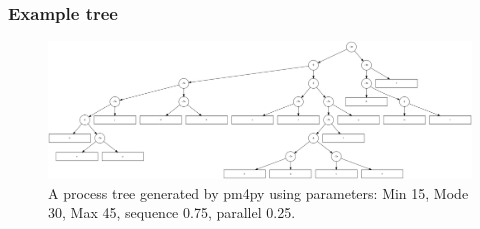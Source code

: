 \documentclass{beamer}
\begin{document}
	\begin{frame}
		\frametitle{Example tree}
		\begin{figure}
			\includegraphics[width=1\textwidth]{figures/process-tree}
			\caption{A process tree generated by pm4py using parameters: Min 15, Mode 30, Max 45, sequence 0.75, parallel 0.25. }
			\label{fig:process-tree}
		\end{figure}
	\end{frame}
	
\end{document}

